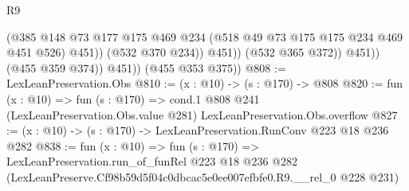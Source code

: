 \begin{lexlean}{R9}
\begin{coremodule}
                          (@385
                            @148
                            @73
                            @177
                            @175
                            @469
                            @234
                            (@518 @49 @73 @175 @175 @234 @469 @451 @526)
                            @451))
                        (@532 @370 @234))
                      @451))
                  (@532 @365 @372))
                @451))
            (@455 @359 @374))
          @451))
      (@455 @353 @375))
@808 := LexLeanPreservation.Obs
@810 := (x : @10) -> (s : @170) -> @808
@820 := fun (x : @10) =>
  fun (s : @170) =>
  cond.{1} @808 @241 (LexLeanPreservation.Obs.value @281) LexLeanPreservation.Obs.overflow
@827 := (x : @10) -> (s : @170) -> LexLeanPreservation.RunConv @223 @18 @236 @282
@838 := fun (x : @10) =>
  fun (s : @170) =>
  LexLeanPreservation.run_of_funRel
    @223
    @18
    @236
    @282
    (LexLeanPreserve.Cf98b59d5f04c0dbcac5e0ee007efbfe0.R9.__rel_0 @228 @231)
\end{coremodule}
\end{lexlean}
